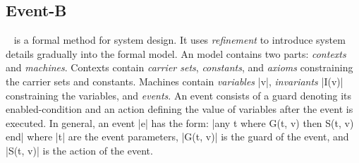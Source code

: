 
\subsection{Event-B}
\label{sec:eventb}

\EventB~\cite{abrial10:_model_event_b,hoang13:_introd_event_b_model_method} is a formal method for system
design.  It uses \emph{refinement} to introduce system details gradually into the
formal model.  An \EventB model contains two parts: \emph{contexts} and \emph{machines}. 
Contexts contain \emph{carrier sets}, \emph{constants}, and \emph{axioms} constraining 
the carrier sets and constants.  Machines contain \emph{variables} |v|, \emph{invariants} |I(v)| 
constraining the variables, and \emph{events}. An event consists of a guard 
denoting its enabled-condition and an action defining the value of variables after the event is executed.  
In general, an event |e| has the form: |any t where G(t, v) then S(t, v) end| where |t| 
are the event parameters, |G(t, v)| is the guard of the event, and |S(t, v)| is the action of the event.

